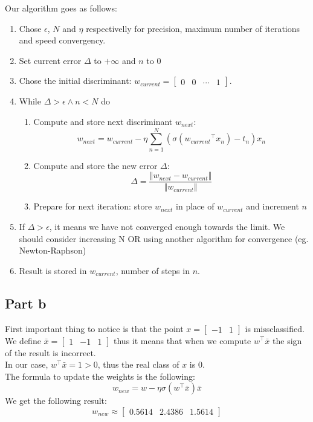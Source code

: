 \documentclass[a4paper, 10pt]{article}
\begin{document}
Our algorithm goes as follows:
\begin{enumerate}
    \item Chose $\epsilon$, $N$ and $\eta$ respectivelly for precision, maximum number of iterations and speed convergency.
    \item Set current error $\Delta$ to $+\infty$ and $n$ to $0$
    \item Chose the initial discriminant: $w_{current} = \begin{bmatrix}0 & 0 & \cdots & 1\end{bmatrix}$.
    \item While $\Delta > \epsilon \wedge n < N$ do
    \begin{enumerate}
        \item Compute and store next discriminant $w_{next}$:
$$
w_{next} = w_{current} - \eta \sum_{n=1}^{N}\left(\sigma({w_{current}}^\top x_n)-t_n\right)x_n
$$
        \item Compute and store the new error $\Delta$:
$$
\Delta = \frac{\left\Vert w_{next} - w_{current}\right\Vert}{\left\Vert w_{current} \right\Vert}
$$
        \item Prepare for next iteration: store $w_{next}$ in place of $w_{current}$ and increment $n$
    \end{enumerate}
    \item If $\Delta > \epsilon$, it means we have not converged enough towards the limit. We should consider increasing N OR using another algorithm for convergence (eg. Newton-Raphson)
    \item Result is stored in $w_{current}$, number of steps in $n$. 
\end{enumerate}

\subsection{Part b}
First important thing to notice is that the point $x=\begin{bmatrix}-1 & 1\end{bmatrix}$ is missclassified.
We define $\bar{x} = \begin{bmatrix}1 & -1 & 1\end{bmatrix}$ thus it means that when we compute 
$w^\top \bar{x}$ the sign of the result is incorrect.
\\
In our case, $w^\top \bar{x} = 1 >0$, thus the real class of $x$ is $0$.
\\
The formula to update the weights is the following:
$$
w_{new} = w - \eta \sigma(w^\top \bar{x})\bar{x}
$$
We get the following result:
$$
w_{new} \approx \begin{bmatrix}0.5614 & 2.4386 & 1.5614\end{bmatrix}
$$
\end{document}

